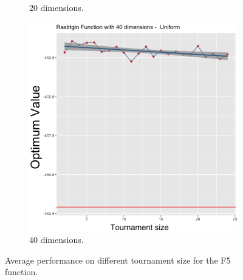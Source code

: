 \begin{figure}[t]
\begin{subfigure}[b]{0.33\textwidth}
		\caption{20 dimensions.}
	\end{subfigure}
	\begin{subfigure}[b]{0.33\textwidth}
		\centering
		\includegraphics[width=\textwidth]{img/multimodal_uniform_3_dim_40.png}
		\caption{40 dimensions.}
	\end{subfigure}
	\caption{Average performance on different tournament size for the F5 function.}
	\label{5}
\end{figure}

